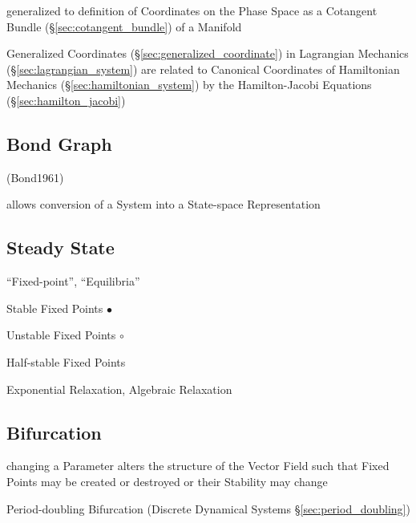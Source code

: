 generalized to definition of Coordinates on the Phase Space as a Cotangent
Bundle (\S\ref{sec:cotangent_bundle}) of a Manifold

Generalized Coordinates (\S\ref{sec:generalized_coordinate}) in Lagrangian
Mechanics (\S\ref{sec:lagrangian_system}) are related to Canonical Coordinates
of Hamiltonian Mechanics (\S\ref{sec:hamiltonian_system}) by the
Hamilton-Jacobi Equations (\S\ref{sec:hamilton_jacobi})



\subsection{Bond Graph}\label{sec:bond_graph}

(Bond1961)

allows conversion of a System into a State-space Representation



\subsection{Steady State}\label{sec:steady_state}

``Fixed-point'', ``Equilibria'' %

Stable Fixed Points $\bullet$

Unstable Fixed Points $\circ$

Half-stable Fixed Points

Exponential Relaxation, Algebraic Relaxation



\subsection{Bifurcation}\label{sec:bifurcation}

changing a Parameter alters the structure of the Vector Field such that Fixed
Points may be created or destroyed or their Stability may change

\fist Period-doubling Bifurcation (Discrete Dynamical Systems
\S\ref{sec:period_doubling})

